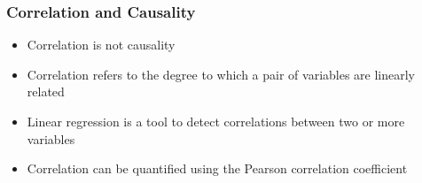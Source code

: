 \subsubsection{Correlation and Causality}
\begin{itemize}
    \item Correlation is not causality
    \item Correlation refers to the degree to which a pair of variables are linearly related
    \item Linear regression is a tool to detect correlations between two or more variables
    \item Correlation can be quantified using the Pearson correlation coefficient
\end{itemize}